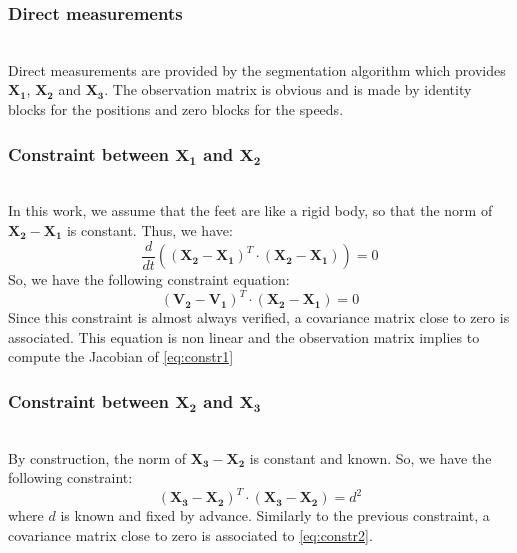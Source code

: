 \documentclass[letterpaper, 10 pt, conference]{ieeeconf}
\begin{document}
\subsubsection{Direct measurements}~\\
Direct measurements are provided by the segmentation algorithm which provides $\mathbf{X_1}$, $\mathbf{X_2}$ and $\mathbf{X_3}$. The observation matrix is obvious and is made by identity blocks for the positions and zero blocks for the speeds.

\subsubsection{Constraint between $\mathbf{X_1}$ and $\mathbf{X_2}$}~\\
In this work, we assume that the feet are like a rigid body, so that the norm of $\mathbf{X_2}-\mathbf{X_1}$ is constant. Thus, we have:
\begin{equation}
	\frac{d}{dt}\left(\left(\mathbf{X_2}-\mathbf{X_1}\right)^T\cdot\left(\mathbf{X_2}-\mathbf{X_1}\right)\right)=0
\end{equation}
So, we have the following constraint equation:
\begin{equation}
	\left(\mathbf{V_2}-\mathbf{V_1}\right)^T\cdot\left(\mathbf{X_2}-\mathbf{X_1}\right)=0
	\label{eq:constr1}
\end{equation}
Since this constraint is almost always verified, a covariance matrix close to zero is associated. This equation is non linear and the observation matrix implies to compute the Jacobian of \eqref{eq:constr1}

\subsubsection{Constraint between $\mathbf{X_2}$ and $\mathbf{X_3}$}~\\
By construction, the norm of $\mathbf{X_3} -\mathbf{X_2}$ is constant and known. So, we have the following constraint:
\begin{equation}
	\left(\mathbf{X_3}-\mathbf{X_2}\right)^T\cdot\left(\mathbf{X_3}-\mathbf{X_2}\right) = d^2
	\label{eq:constr2}
\end{equation}
where $d$ is known and fixed by advance. Similarly to the previous constraint, a covariance matrix close to zero is associated to \eqref{eq:constr2}.
\end{document}
